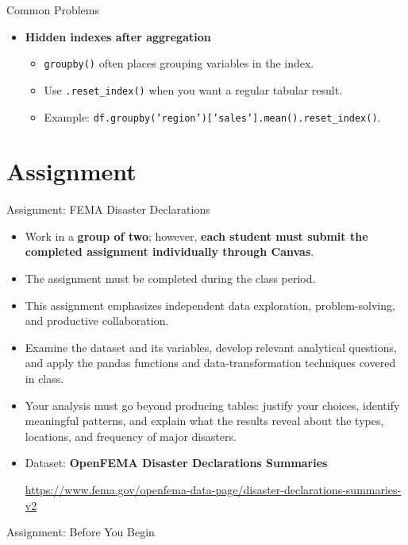 \documentclass[11pt,aspectratio=43]{beamer}
\begin{document}
\begin{frame}{Common Problems}
\begin{itemize}
    \item \textbf{Hidden indexes after aggregation}
    \begin{itemize}
      \tiny
      \item \texttt{groupby()} often places grouping variables in the index.
      \item Use \texttt{.reset\_index()} when you want a regular tabular result.
      \item Example:
      \texttt{df.groupby('region')['sales'].mean().reset\_index()}.
    \end{itemize}

  \end{itemize}
\end{frame}

{
  \section{Assignment}
\begin{frame}{Assignment: FEMA Disaster Declarations}
  \small

  \begin{itemize}
    \item Work in a \textbf{group of two}; however, \textbf{each student must submit the completed assignment individually through Canvas}.
    \item The assignment must be completed during the class period.
    \item This assignment emphasizes independent data exploration, problem-solving, and productive collaboration.
    \item Examine the dataset and its variables, develop relevant analytical questions, and apply the pandas functions and data-transformation techniques covered in class.
    \item Your analysis must go beyond producing tables: justify your choices, identify meaningful patterns, and explain what the results reveal about the types, locations, and frequency of major disasters.
    \item Dataset: \textbf{OpenFEMA Disaster Declarations Summaries}

    {\tiny
      \url{https://www.fema.gov/openfema-data-page/disaster-declarations-summaries-v2}
    }
  \end{itemize}
\end{frame}


\begin{frame}{Assignment: Before You Begin}
  \small


\end{frame}}
\end{document}
